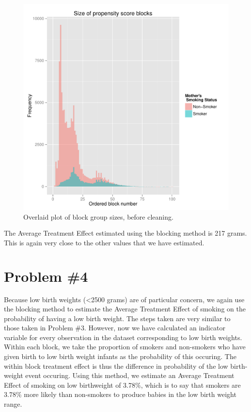 \documentclass[letterpaper, 12pt]{article}
\begin{document}
\begin{figure}[h!]
   \centering
   \includegraphics[width=6in]{img/blockplot.pdf} 
   \caption{Overlaid plot of block group sizes, before cleaning.}
   \label{fig:blocks}
\end{figure}

The Average Treatment Effect estimated using the blocking method is 217 grams. This is again very close to the other values that we have estimated.

\section{Problem \#4}
Because low birth weights (<2500 grams) are of particular concern, we again use the blocking method to estimate the Average Treatment Effect of smoking on the probability of having a low birth weight. The steps taken are very similar to those taken in Problem \#3. However, now we have calculated an indicator variable for every observation in the dataset corresponding to low birth weights. Within each block, we take the proportion of smokers and non-smokers who have given birth to low birth weight infants as the probability of this occuring. The within block treatment effect is thus the difference in probability of the low birth-weight event occuring. Using this method, we estimate an Average Treatment Effect of smoking on low birthweight of 3.78\%, which is to say that smokers are 3.78\% more likely than non-smokers to produce babies in the low birth weight range.
\end{document}
